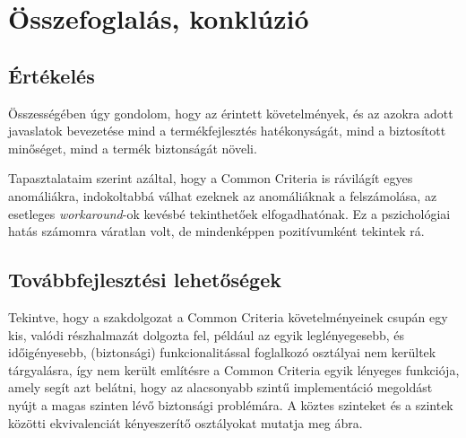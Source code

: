 \chapter{Összefoglalás, konklúzió}

\section{Értékelés}

Összességében úgy gondolom, hogy az érintett követelmények, és az azokra adott javaslatok bevezetése
mind a termékfejlesztés hatékonyságát, mind a biztosított minőséget, mind a termék biztonságát
növeli. 


Tapasztalataim szerint azáltal, hogy a Common Criteria is rávilágít egyes anomáliákra, indokoltabbá
válhat ezeknek az anomáliáknak a felszámolása, az esetleges \emph{workaround}-ok kevésbé
tekinthetőek elfogadhatónak. Ez a pszichológiai hatás számomra váratlan volt, de mindenképpen
pozitívumként tekintek rá.

\section{Továbbfejlesztési lehetőségek}
Tekintve, hogy a szakdolgozat a Common Criteria követelményeinek csupán egy kis, valódi részhalmazát
dolgozta fel, például az egyik leglényegesebb, és időigényesebb, (biztonsági) funkcionalitással
foglalkozó osztályai nem kerültek tárgyalásra, így nem került említésre a Common Criteria egyik
lényeges funkciója, amely segít azt belátni, hogy az alacsonyabb szintű implementáció megoldást
nyújt a magas szinten lévő biztonsági problémára. A köztes szinteket és a szintek közötti
ekvivalenciát kényeszerítő osztályokat mutatja meg  ábra.

